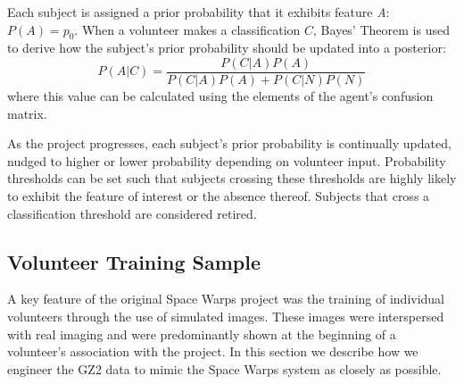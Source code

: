 \documentclass[twocolumn]{aastex6}
\newcommand{\A}{\textit{A}}
\begin{document}
Each subject is assigned a prior probability that it exhibits feature \A: $P(A) = p_0$. 
When a volunteer makes a classification $C$, Bayes' Theorem is used to derive how 
the subject's prior probability should be updated into a posterior: 
\begin{equation}
P(A|C) = \frac{ P(C|A) P(A) }{P(C|A) P(A) + P(C|N) P(N)}
\end{equation}
where this value can be calculated using the elements of the agent's 
confusion matrix. 


As the project progresses, each subject's prior probability is continually updated,
 nudged to higher or lower probability depending on volunteer input.
Probability thresholds can be set such that subjects crossing these thresholds 
are highly likely to exhibit the feature of interest or the absence thereof. Subjects that
cross a classification threshold are considered retired. 



\subsection{Volunteer Training Sample}\label{sec: training sample}

A key feature of the original Space Warps project was the training of 
individual volunteers through the use of simulated images.
These images were interspersed with real imaging and were 
predominantly shown at the beginning of a volunteer's association with the project. 
In this section we describe how we engineer the GZ2 data to mimic the Space 
Warps system as closely as possible.
\end{document}

